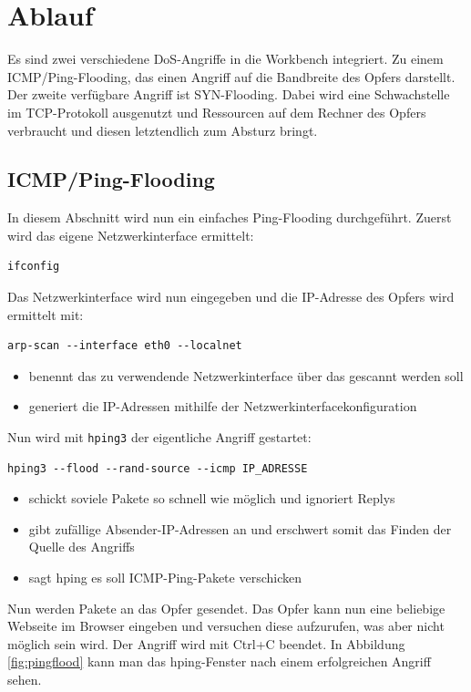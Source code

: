 \section{Ablauf}
Es sind zwei verschiedene DoS-Angriffe in die Workbench integriert. Zu einem ICMP/Ping-Flooding, das einen Angriff auf die Bandbreite des Opfers darstellt. Der zweite verfügbare Angriff ist SYN-Flooding. Dabei wird eine Schwachstelle im TCP-Protokoll ausgenutzt und Ressourcen auf dem Rechner des Opfers verbraucht und diesen letztendlich zum Absturz bringt.

\subsection{ICMP/Ping-Flooding}

In diesem Abschnitt wird nun ein einfaches Ping-Flooding durchgeführt. Zuerst wird das eigene Netzwerkinterface ermittelt:
\begin{lstlisting}
ifconfig
\end{lstlisting}
Das Netzwerkinterface wird nun eingegeben und die IP-Adresse des Opfers wird ermittelt mit:
\begin{lstlisting}
arp-scan --interface eth0 --localnet
\end{lstlisting}
\begin{itemize}
	\item {} benennt das zu verwendende Netzwerkinterface über das gescannt werden soll
	\item {} generiert die IP-Adressen mithilfe der Netzwerkinterfacekonfiguration
\end{itemize}

Nun wird mit \colorbox{altgray}{\lstinline|hping3|} der eigentliche Angriff gestartet:
\begin{lstlisting}
hping3 --flood --rand-source --icmp IP_ADRESSE
\end{lstlisting}
\begin{itemize}
	\item {} schickt soviele Pakete so schnell wie möglich und ignoriert Replys
	\item {} gibt zufällige Absender-IP-Adressen an und erschwert somit das Finden der Quelle des Angriffs
	\item {} sagt hping es soll ICMP-Ping-Pakete verschicken
\end{itemize}
Nun werden Pakete an das Opfer gesendet. Das Opfer kann nun eine beliebige Webseite im Browser eingeben und versuchen diese aufzurufen, was aber nicht möglich sein wird.
Der Angriff wird mit Ctrl+C beendet. In Abbildung \ref{fig:pingflood} kann man das hping-Fenster nach einem erfolgreichen Angriff sehen.

